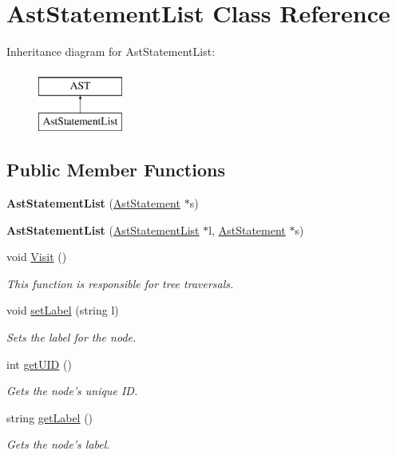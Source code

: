 \hypertarget{classAstStatementList}{\section{Ast\-Statement\-List Class Reference}
\label{classAstStatementList}
}
Inheritance diagram for Ast\-Statement\-List\-:\begin{figure}[H]
\begin{center}
\leavevmode
\includegraphics[height=2.000000cm]{classAstStatementList}
\end{center}
\end{figure}
\subsection*{Public Member Functions}
\begin{DoxyCompactItemize}
\item 
\hypertarget{classAstStatementList_a4ac59b2b83022bdbdc5185b0c03688cd}{{\bfseries Ast\-Statement\-List} (\hyperlink{classAstStatement}{Ast\-Statement} $\ast$s)}\label{classAstStatementList_a4ac59b2b83022bdbdc5185b0c03688cd}

\item 
\hypertarget{classAstStatementList_abbf3a704a21fbecef5f4ce1be24449b3}{{\bfseries Ast\-Statement\-List} (\hyperlink{classAstStatementList}{Ast\-Statement\-List} $\ast$l, \hyperlink{classAstStatement}{Ast\-Statement} $\ast$s)}\label{classAstStatementList_abbf3a704a21fbecef5f4ce1be24449b3}

\item 
void \hyperlink{classAstStatementList_a3390e533f15c418a597e1eb3b2a14b99}{Visit} ()
\begin{DoxyCompactList}\small\item\em This function is responsible for tree traversals. \end{DoxyCompactList}\item 
void \hyperlink{classAST_a71d680856e95ff89f55d5311a552eba6}{set\-Label} (string l)
\begin{DoxyCompactList}\small\item\em Sets the label for the node. \end{DoxyCompactList}\item 
int \hyperlink{classAST_ab7a5b1d9f1c2de0d98deb356f724a42c}{get\-U\-I\-D} ()
\begin{DoxyCompactList}\small\item\em Gets the node's unique I\-D. \end{DoxyCompactList}\item 
string \hyperlink{classAST_aee029be902fffc927d16ccb03eb922ad}{get\-Label} ()
\begin{DoxyCompactList}\small\item\em Gets the node's label. \end{DoxyCompactList}\end{DoxyCompactItemize}
